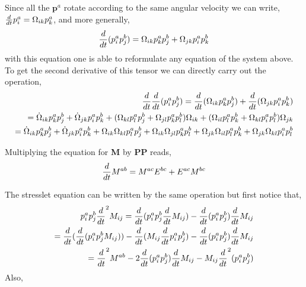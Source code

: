 Since all the $\textbf{p}^a$ rotate according to the same angular velocity we can write, $\frac{d}{d t} p_i^a =\Omega_{ik} p_k^a$, and more generally, 
\begin{equation*}
    \frac{d}{d t}(p_i^ap_j^b)
    = 
    \Omega_{ik} p_k^ap_j^b
    + \Omega_{jk} p_i^ap_k^b
\end{equation*}
with this equation one is able to reformulate any equation of the system above.
To get the second derivative of this tensor we can directly carry out the operation,  
\begin{align*}
    \frac{d}{d t}\frac{d}{d t}(p_i^ap_j^b)
    = 
    \frac{d}{d t} (\Omega_{ik} p_k^ap_j^b)
    + \frac{d}{d t} (\Omega_{jk} p_i^ap_k^b)\\
    = 
    \dot{\Omega}_{ik} p_k^ap_j^b
    + \dot{\Omega}_{jk} p_i^ap_k^b
    + (
        \Omega_{kl} p_l^ap_j^b
    + \Omega_{jl} p_k^ap_l^b
    )\Omega_{ik}
    + (\Omega_{il} p_l^ap_k^b
    + \Omega_{kl} p_i^ap_l^b)\Omega_{jk}\\
    = 
    \dot{\Omega}_{ik} p_k^ap_j^b
    + \dot{\Omega}_{jk} p_i^ap_k^b
    + \Omega_{ik}\Omega_{kl} p_l^ap_j^b
    + \Omega_{ik}\Omega_{jl} p_k^ap_l^b
    + \Omega_{jk}\Omega_{il} p_l^ap_k^b
    + \Omega_{jk}\Omega_{kl} p_i^ap_l^b\\
\end{align*}

Multiplying the equation for \textbf{M} by $\textbf{PP}$ reads, 
\begin{equation*}
    \frac{d}{d t} M^{ab}
    = 
    M^{ac} E^{bc} 
    + E^{ac} M^{bc}
\end{equation*}

The stresslet equation can be written by the same operation but first notice that, 
\begin{align}
    p_i^ap_j^b\frac{d}{d t}^2 M_{ij}
    = 
    \frac{d}{d t}( p_i^ap_j^b \frac{d}{d t} M_{ij})
    - \frac{d}{d t} (p_i^ap_j^b )\frac{d}{d t} M_{ij}\\
    = 
    \frac{d}{d t}( \frac{d}{d t} (p_i^ap_j^b M_{ij}))
    - \frac{d}{d t}(   M_{ij} \frac{d}{d t}  p_i^ap_j^b )
    - \frac{d}{d t} (p_i^ap_j^b )\frac{d}{d t} M_{ij}\\
    = 
    \frac{d}{d t}^2 M^{ab}
    - 2 \frac{d}{d t} (p_i^ap_j^b) \frac{d}{d t} M_{ij}
    - M_{ij} \frac{d}{d t}^2 (p_i^ap_j^b)
    \\
\end{align}
Also, 

